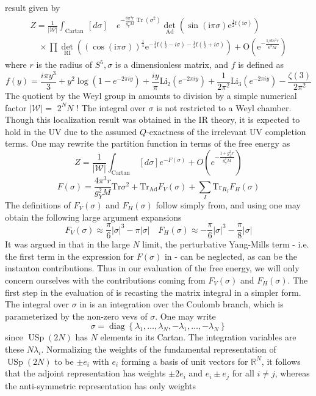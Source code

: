 \documentclass{article}
\begin{document}
result given by
\[
\begin{array}{l}
Z=\frac{1}{|\mathcal{W}|} \int_{\text {Cartan }}[d \sigma] \quad e^{-\frac{8 \pi^{3} r}{g_{Y}^{3} M} \operatorname{Tr}(\sigma^{2})} \det_{\mathrm{Ad}}\left(\sin \left(\mathrm{i} \pi \sigma\right) \mathrm{e}^{\frac{1}{2} \mathrm{f}\left(\mathrm{i} \sigma\right)}\right) \\
\quad \times \prod \det_{\mathrm{RI}}\left((\cos (\mathrm{i} \pi \sigma))^{\frac{1}{4}} \mathrm{e}^{-\frac{1}{4} \mathrm{f}\left(\frac{1}{2}-i \sigma\right)-\frac{1}{4} \mathrm{f}\left(\frac{1}{2}+i \sigma\right)}\right)+\mathrm{O}\left(\mathrm{e}^{-\frac{1 / 6 \pi^{3} r}{6^{2} M}}\right)
\end{array}
\]
where \(r\) is the radius of \(S^{5}, \sigma\) is a dimensionless matrix, and \(f\) is defined as
\[
f(y)=\frac{i \pi y^{3}}{3}+y^{2} \log \left(1-e^{-2 \pi i y}\right)+\frac{i y}{\pi} \mathrm{Li}_{2}\left(e^{-2 \pi i y}\right)+\frac{1}{2 \pi^{2}} \mathrm{Li}_{3}\left(e^{-2 \pi i y}\right)-\frac{\zeta(3)}{2 \pi^{2}}
\]
The quotient by the Weyl group in amounts to division by a simple numerical factor \(|\mathcal{W}|=\) \(2^{N} N\) ! The integral over \(\sigma\) is not restricted to a Weyl chamber. Though this localization result was obtained in the IR theory, it is expected to hold in the UV due to the assumed \(Q\)-exactness of the irrelevant UV completion terms. One may rewrite the partition function in terms of the free energy as
\[
Z=\frac{1}{|\mathcal{W}|} \int_{\text {Cartan }}{[d \sigma] e^{-F(\sigma)}+O\left(e^{-\frac{1+g_{X}^{2} r}{g_{Y}^{2} M}}\right)}
\]
\[
F(\sigma)=\frac{4 \pi^{3} r}{g_{Y}^{2} M} \mathrm{Tr} \sigma^{2}+\mathrm{Tr}_{\mathrm{Ad}} F_{V}(\sigma)+\sum_{I} \mathrm{Tr}_{R_{I}} F_{H}(\sigma)
\]
The definitions of \(F_{V}(\sigma)\) and \(F_{H}(\sigma)\) follow simply from, and using one may obtain the following large argument expansions
\[
F_{V}(\sigma) \approx \frac{\pi}{6}|\sigma|^{3}-\pi|\sigma| \quad F_{H}(\sigma) \approx-\frac{\pi}{6}|\sigma|^{3}-\frac{\pi}{8}|\sigma|
\]
It was argued in that in the large \(N\) limit, the perturbative Yang-Mills term - i.e. the first term in the expression for \(F(\sigma)\) in - can be neglected, as can be the instanton contributions. Thus in our evaluation of the free energy, we will only concern ourselves with the contributions coming from \(F_{V}(\sigma)\) and \(F_{H}(\sigma)\). The first step in the evaluation of is recasting the matrix integral in a simpler form. The integral over \(\sigma\) in is an integration over the Coulomb branch, which is parameterized by the non-zero vevs of \(\sigma\). One may write
\[
\sigma=\operatorname{diag}\left\{\lambda_{1}, \ldots, \lambda_{N},-\lambda_{1}, \ldots,-\lambda_{N}\right\}
\]
since \(\operatorname{USp}(2 N)\) has \(N\) elements in its Cartan. The integration variables are these \(N \lambda_{i}\). Normalizing the weights of the fundamental representation of \(\operatorname{USp}(2 N)\) to be \(\pm e_{i}\) with \(e_{i}\) forming a basis of unit vectors for \(\mathbb{R}^{N}\), it follows that the adjoint representation has weights \(\pm 2 e_{i}\) and \(e_{i} \pm e_{j}\) for all \(i \neq j\), whereas the anti-symmetric representation has only weights
\end{document}
